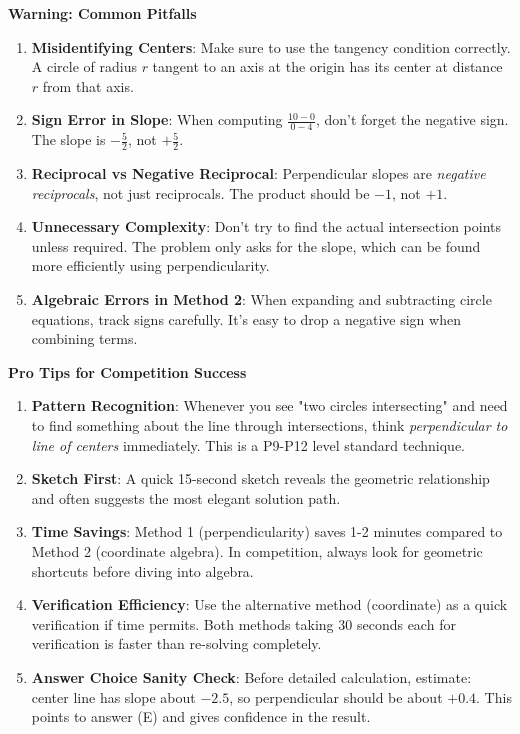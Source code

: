 \documentclass[12pt]{article}
\begin{document}
\begin{warningbox}
\textbf{Warning: Common Pitfalls}

\begin{enumerate}
    \item \textbf{Misidentifying Centers}: Make sure to use the tangency condition correctly. A circle of radius $r$ tangent to an axis at the origin has its center at distance $r$ from that axis.
    
    \item \textbf{Sign Error in Slope}: When computing $\frac{10-0}{0-4}$, don't forget the negative sign. The slope is $-\frac{5}{2}$, not $+\frac{5}{2}$.
    
    \item \textbf{Reciprocal vs Negative Reciprocal}: Perpendicular slopes are \emph{negative reciprocals}, not just reciprocals. The product should be $-1$, not $+1$.
    
    \item \textbf{Unnecessary Complexity}: Don't try to find the actual intersection points unless required. The problem only asks for the slope, which can be found more efficiently using perpendicularity.
    
    \item \textbf{Algebraic Errors in Method 2}: When expanding and subtracting circle equations, track signs carefully. It's easy to drop a negative sign when combining terms.
\end{enumerate}
\end{warningbox}

\begin{tipbox}
\textbf{Pro Tips for Competition Success}

\begin{enumerate}
    \item \textbf{Pattern Recognition}: Whenever you see "two circles intersecting" and need to find something about the line through intersections, think \emph{perpendicular to line of centers} immediately. This is a P9-P12 level standard technique.
    
    \item \textbf{Sketch First}: A quick 15-second sketch reveals the geometric relationship and often suggests the most elegant solution path.
    
    \item \textbf{Time Savings}: Method 1 (perpendicularity) saves 1-2 minutes compared to Method 2 (coordinate algebra). In competition, always look for geometric shortcuts before diving into algebra.
    
    \item \textbf{Verification Efficiency}: Use the alternative method (coordinate) as a quick verification if time permits. Both methods taking 30 seconds each for verification is faster than re-solving completely.
    
    \item \textbf{Answer Choice Sanity Check}: Before detailed calculation, estimate: center line has slope about $-2.5$, so perpendicular should be about $+0.4$. This points to answer (E) and gives confidence in the result.
\end{enumerate}
\end{tipbox}
\end{document}
